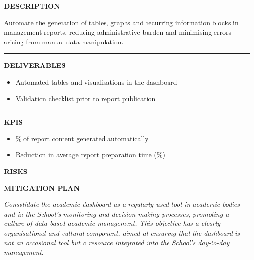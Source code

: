 \documentclass[11pt,a4paper]{scrreprt}
\newcommand{\fieldlabel}[1]{%
  {\footnotesize\sffamily\bfseries\color{mutedcolor}\MakeUppercase{#1}}\par\nopagebreak[4]
}
\newcommand{\fieldsep}{\vspace{3pt}\noindent\textcolor{bordercolor}{\rule{\linewidth}{0.4pt}}\vspace{3pt}\par}
\begin{document}
\begin{tcolorbox}[pabox={dashcolor}{A.P.4.2 \enspace\textbullet\enspace Automation of Key Content in Management Reports}]

\fieldlabel{Description}
{\small Automate the generation of tables, graphs and recurring information blocks in management reports, reducing administrative burden and minimising errors arising from manual data manipulation.}\par
\fieldsep
\fieldlabel{Deliverables}
{\small \begin{itemize}[noitemsep,topsep=2pt]
\item Automated tables and visualisations in the dashboard
\item Validation checklist prior to report publication
\end{itemize}}\par
\fieldsep
\fieldlabel{KPIs}
{\small \begin{itemize}[noitemsep,topsep=2pt]
\item \% of report content generated automatically
\item Reduction in average report preparation time (\%)
\end{itemize}}\par
\end{tcolorbox}
\begin{tcolorbox}[riskbox]
{\footnotesize\sffamily\bfseries\color{red!50!black} RISKS}\par{}
\end{tcolorbox}
\begin{tcolorbox}[mitbox]
{\footnotesize\sffamily\bfseries\color{green!40!black} MITIGATION PLAN}\par{}
\end{tcolorbox}
\vspace{8pt}

\newpage
{}
{\small\color{mutedcolor}\itshape Consolidate the academic dashboard as a regularly used tool in academic bodies and in the School's monitoring and decision-making processes, promoting a culture of data-based academic management. This objective has a clearly organisational and cultural component, aimed at ensuring that the dashboard is not an occasional tool but a resource integrated into the School's day-to-day management.}\par\vspace{6pt}
\end{document}
